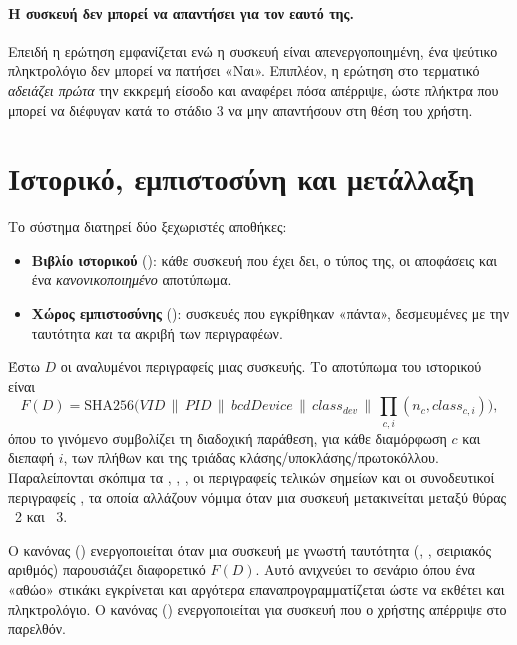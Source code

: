\paragraph{Η συσκευή δεν μπορεί να απαντήσει για τον εαυτό της.}
Επειδή η ερώτηση εμφανίζεται ενώ η συσκευή είναι απενεργοποιημένη, ένα ψεύτικο
πληκτρολόγιο δεν μπορεί να πατήσει «Ναι». Επιπλέον, η ερώτηση στο τερματικό
\emph{αδειάζει πρώτα} την εκκρεμή είσοδο και αναφέρει πόσα  απέρριψε,
ώστε πλήκτρα που μπορεί να διέφυγαν κατά το στάδιο 3 να μην απαντήσουν στη θέση
του χρήστη.

\section{Ιστορικό, εμπιστοσύνη και μετάλλαξη}
\label{sec:design-trust}

Το σύστημα διατηρεί δύο ξεχωριστές αποθήκες:

\begin{itemize}
  \item \textbf{Βιβλίο ιστορικού} (): κάθε συσκευή που έχει δει, ο
        τύπος της, οι αποφάσεις και ένα \emph{κανονικοποιημένο} αποτύπωμα.
  \item \textbf{Χώρος εμπιστοσύνης} (): συσκευές που εγκρίθηκαν
        «πάντα», δεσμευμένες με την ταυτότητα \emph{και} τα ακριβή
         των περιγραφέων.
\end{itemize}

\begin{definition}
Έστω $D$ οι αναλυμένοι περιγραφείς μιας συσκευής. Το αποτύπωμα του ιστορικού
είναι
\[
  F(D) = \mathrm{SHA256}\big(\mathit{VID}\,\|\,\mathit{PID}\,\|\,\mathit{bcdDevice}\,\|\,
         \mathit{class}_{dev}\,\|\,\textstyle\prod_{c,i}(n_c,\mathit{class}_{c,i})\big),
\]
όπου το γινόμενο συμβολίζει τη διαδοχική παράθεση, για κάθε διαμόρφωση $c$ και
διεπαφή $i$, των πλήθων και της τριάδας κλάσης/υποκλάσης/πρωτοκόλλου.
Παραλείπονται σκόπιμα τα , ,
, οι περιγραφείς τελικών σημείων και οι συνοδευτικοί περιγραφείς
, τα οποία αλλάζουν νόμιμα όταν μια συσκευή μετακινείται μεταξύ
θύρας ~2 και ~3.
\end{definition}

Ο κανόνας  (\sevC) ενεργοποιείται όταν μια συσκευή με
γνωστή ταυτότητα (, , σειριακός αριθμός) παρουσιάζει διαφορετικό
$F(D)$. Αυτό ανιχνεύει το σενάριο όπου ένα «αθώο» στικάκι εγκρίνεται και αργότερα
επαναπρογραμματίζεται ώστε να εκθέτει και πληκτρολόγιο. Ο κανόνας
 (\sevC) ενεργοποιείται για συσκευή που ο χρήστης
απέρριψε στο παρελθόν.

